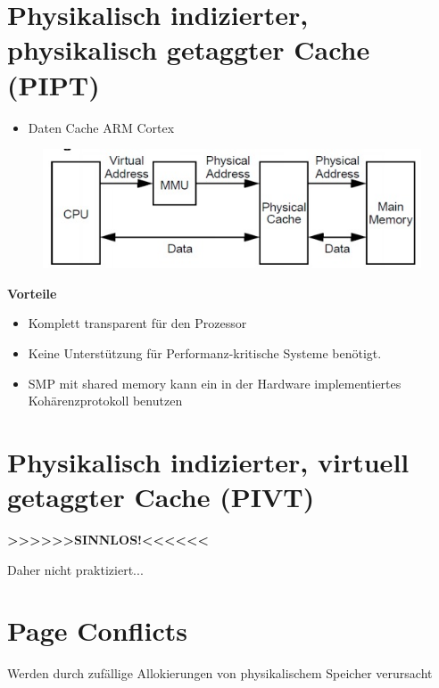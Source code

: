 \documentclass[a4paper]{scrreprt}
\begin{document}
\section{Physikalisch indizierter, physikalisch getaggter Cache (PIPT)}

\begin{itemize}
\item Daten Cache ARM Cortex
\end{itemize}

\begin{figure}[ht]
\centering
\includegraphics[scale=0.5]{graphics/PIPT.png}
\end{figure}

\textbf{Vorteile}
\begin{itemize}
\item Komplett transparent für den Prozessor
\item Keine Unterstützung für Performanz-kritische Systeme benötigt.
\item SMP mit shared memory kann ein in der Hardware implementiertes Kohärenzprotokoll benutzen
\end{itemize}
\section{Physikalisch indizierter, virtuell getaggter Cache (PIVT)}
\begin{huge}
\textbf{>>>>>>SINNLOS!<<<<<<} 
\end{huge}
\begin{small}
Daher nicht praktiziert...
\end{small}

\section{Page Conflicts}

Werden durch zufällige Allokierungen von physikalischem Speicher verursacht
\end{document}
